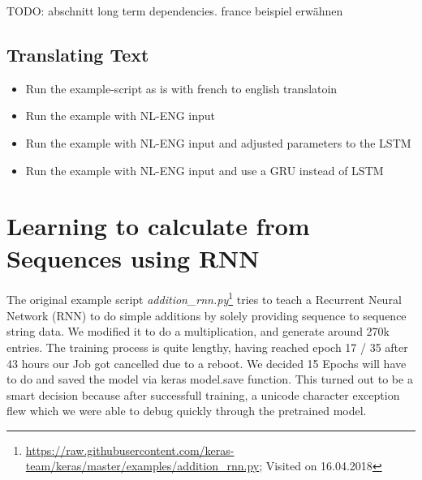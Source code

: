 \documentclass{article}[]
\begin{document}
TODO: abschnitt long term dependencies. france beispiel erwähnen

\subsection{Translating Text}
\label{sec:trans}
\begin{itemize}
\item{Run the example-script as is with french to english translatoin}
\item{Run the example with NL-ENG input}
\item{Run the example with NL-ENG input and adjusted parameters to the LSTM}
\item{Run the example with NL-ENG input and use a GRU instead of LSTM}
\end{itemize}

\section{Learning to calculate from Sequences using RNN}
\label{sec:rnn}


The original example script \textit{addition_rnn.py}\footnote{\url{https://raw.githubusercontent.com/keras-team/keras/master/examples/addition_rnn.py}; Visited on 16.04.2018} tries to teach a Recurrent Neural Network (RNN) to do simple additions by solely providing sequence to sequence string data.
We modified it to do a multiplication, and generate around 270k entries. The training process is quite lengthy, having reached epoch 17 / 35 after 43 hours our Job got cancelled due to a reboot.
We decided 15 Epochs will have to do and saved the model via keras model.save function. This turned out to be a smart decision because after successfull training, a unicode character exception flew which we were able to debug quickly through the pretrained model.
\end{document}
